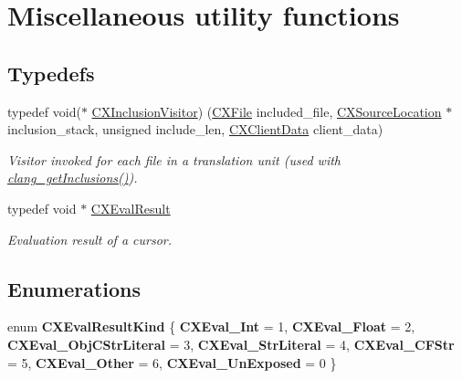 \hypertarget{group__CINDEX__MISC}{}\section{Miscellaneous utility functions}
\label{group__CINDEX__MISC}
\subsection*{Typedefs}
\begin{DoxyCompactItemize}
\item 
typedef void($\ast$ \mbox{\hyperlink{group__CINDEX__MISC_ga075c50e5cf912f15d902cff864ea7d13}{C\+X\+Inclusion\+Visitor}}) (\mbox{\hyperlink{group__CINDEX__FILES_gacfcea9c1239c916597e2e5b3e109215a}{C\+X\+File}} included\+\_\+file, \mbox{\hyperlink{structCXSourceLocation}{C\+X\+Source\+Location}} $\ast$inclusion\+\_\+stack, unsigned include\+\_\+len, \mbox{\hyperlink{group__CINDEX_gacfa40c3de26d228c0d898403c2c21612}{C\+X\+Client\+Data}} client\+\_\+data)
\begin{DoxyCompactList}\small\item\em Visitor invoked for each file in a translation unit (used with \mbox{\hyperlink{group__CINDEX__MISC_ga4363bd8c203ca2b5dfc23c5765695d60}{clang\+\_\+get\+Inclusions()}}). \end{DoxyCompactList}\item 
\mbox{\label{group__CINDEX__MISC_gaa9270afc68877e1f3b20ce5b343191bc}} 
typedef void $\ast$ \mbox{\hyperlink{group__CINDEX__MISC_gaa9270afc68877e1f3b20ce5b343191bc}{C\+X\+Eval\+Result}}
\begin{DoxyCompactList}\small\item\em Evaluation result of a cursor. \end{DoxyCompactList}\end{DoxyCompactItemize}
\subsection*{Enumerations}
\begin{DoxyCompactItemize}
\item 
\mbox{\label{group__CINDEX__MISC_ga71ffcbb614704d05b059e7edce9465fe}} 
enum {\bfseries C\+X\+Eval\+Result\+Kind} \{ \newline
{\bfseries C\+X\+Eval\+\_\+\+Int} = 1, 
{\bfseries C\+X\+Eval\+\_\+\+Float} = 2, 
{\bfseries C\+X\+Eval\+\_\+\+Obj\+C\+Str\+Literal} = 3, 
{\bfseries C\+X\+Eval\+\_\+\+Str\+Literal} = 4, 
\newline
{\bfseries C\+X\+Eval\+\_\+\+C\+F\+Str} = 5, 
{\bfseries C\+X\+Eval\+\_\+\+Other} = 6, 
{\bfseries C\+X\+Eval\+\_\+\+Un\+Exposed} = 0
 \}
\end{DoxyCompactItemize}
